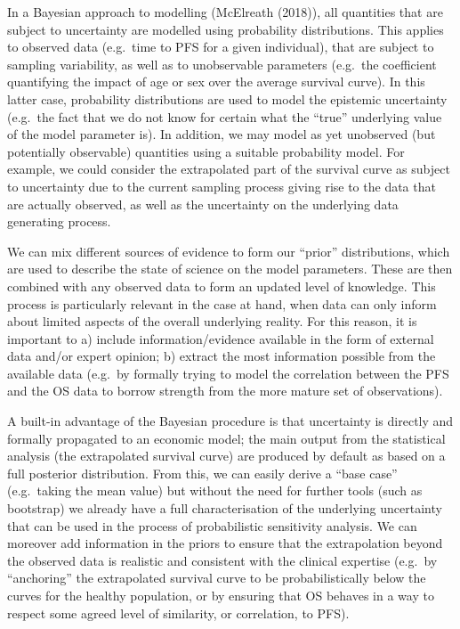 \documentclass[
]{article}
\begin{document}
In a Bayesian approach to modelling (McElreath (2018)), all quantities
that are subject to uncertainty are modelled using probability
distributions. This applies to observed data (e.g.~time to PFS for a
given individual), that are subject to sampling variability, as well as
to unobservable parameters (e.g.~the coefficient quantifying the impact
of age or sex over the average survival curve). In this latter case,
probability distributions are used to model the epistemic uncertainty
(e.g.~the fact that we do not know for certain what the ``true''
underlying value of the model parameter is). In addition, we may model
as yet unobserved (but potentially observable) quantities using a
suitable probability model. For example, we could consider the
extrapolated part of the survival curve as subject to uncertainty due to
the current sampling process giving rise to the data that are actually
observed, as well as the uncertainty on the underlying data generating
process.

We can mix different sources of evidence to form our ``prior''
distributions, which are used to describe the state of science on the
model parameters. These are then combined with any observed data to form
an updated level of knowledge. This process is particularly relevant in
the case at hand, when data can only inform about limited aspects of the
overall underlying reality. For this reason, it is important to a)
include information/evidence available in the form of external data
and/or expert opinion; b) extract the most information possible from the
available data (e.g.~by formally trying to model the correlation between
the PFS and the OS data to borrow strength from the more mature set of
observations).

A built-in advantage of the Bayesian procedure is that uncertainty is
directly and formally propagated to an economic model; the main output
from the statistical analysis (the extrapolated survival curve) are
produced by default as based on a full posterior distribution. From
this, we can easily derive a ``base case'' (e.g.~taking the mean value)
but without the need for further tools (such as bootstrap) we already
have a full characterisation of the underlying uncertainty that can be
used in the process of probabilistic sensitivity analysis. We can
moreover add information in the priors to ensure that the extrapolation
beyond the observed data is realistic and consistent with the clinical
expertise (e.g.~by ``anchoring'' the extrapolated survival curve to be
probabilistically below the curves for the healthy population, or by
ensuring that OS behaves in a way to respect some agreed level of
similarity, or correlation, to PFS).
\end{document}
